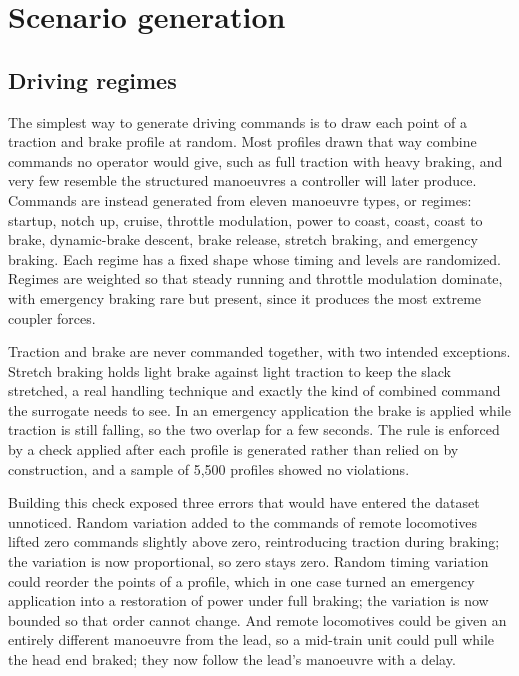 \section{Scenario generation}
\label{sec:dataset_generation}

\subsection{Driving regimes}
\label{sec:dataset_regimes}

The simplest way to generate driving commands is to draw each point of a traction and brake profile at random. Most profiles drawn that way combine commands no operator would give, such as full traction with heavy braking, and very few resemble the structured manoeuvres a controller will later produce. Commands are instead generated from eleven manoeuvre types, or regimes: startup, notch up, cruise, throttle modulation, power to coast, coast, coast to brake, dynamic-brake descent, brake release, stretch braking, and emergency braking. Each regime has a fixed shape whose timing and levels are randomized. Regimes are weighted so that steady running and throttle modulation dominate, with emergency braking rare but present, since it produces the most extreme coupler forces.

Traction and brake are never commanded together, with two intended exceptions. Stretch braking holds light brake against light traction to keep the slack stretched, a real handling technique and exactly the kind of combined command the surrogate needs to see. In an emergency application the brake is applied while traction is still falling, so the two overlap for a few seconds. The rule is enforced by a check applied after each profile is generated rather than relied on by construction, and a sample of 5,500 profiles showed no violations.

Building this check exposed three errors that would have entered the dataset unnoticed. Random variation added to the commands of remote locomotives lifted zero commands slightly above zero, reintroducing traction during braking; the variation is now proportional, so zero stays zero. Random timing variation could reorder the points of a profile, which in one case turned an emergency application into a restoration of power under full braking; the variation is now bounded so that order cannot change. And remote locomotives could be given an entirely different manoeuvre from the lead, so a mid-train unit could pull while the head end braked; they now follow the lead's manoeuvre with a delay.

